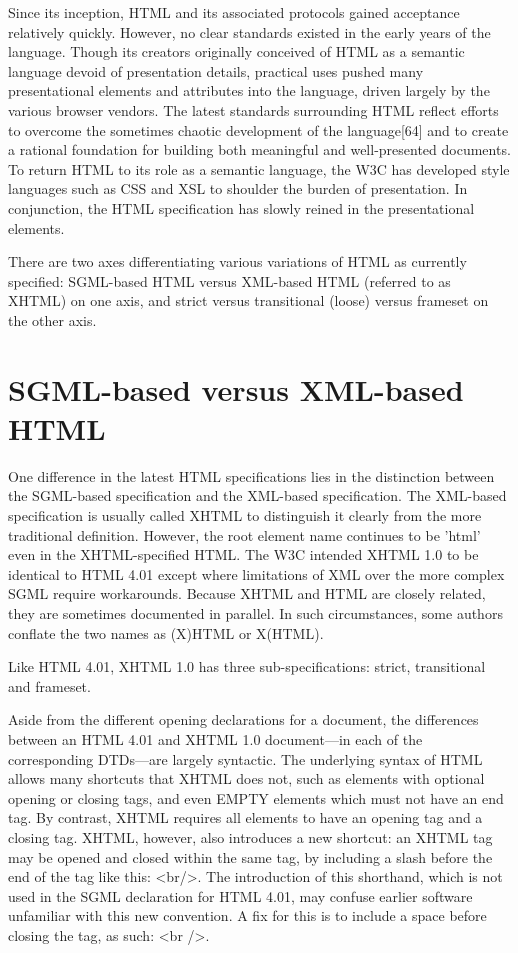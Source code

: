Since its inception, HTML and its associated protocols gained acceptance relatively quickly. However, no clear standards existed in the early years of the language. Though its creators originally conceived of HTML as a semantic language devoid of presentation details, practical uses pushed many presentational elements and attributes into the language, driven largely by the various browser vendors. The latest standards surrounding HTML reflect efforts to overcome the sometimes chaotic development of the language[64] and to create a rational foundation for building both meaningful and well-presented documents. To return HTML to its role as a semantic language, the W3C has developed style languages such as CSS and XSL to shoulder the burden of presentation. In conjunction, the HTML specification has slowly reined in the presentational elements.


There are two axes differentiating various variations of HTML as currently specified: SGML-based HTML versus XML-based HTML (referred to as XHTML) on one axis, and strict versus transitional (loose) versus frameset on the other axis.


\section{SGML-based versus XML-based HTML}


One difference in the latest HTML specifications lies in the distinction between the SGML-based specification and the XML-based specification. The XML-based specification is usually called XHTML to distinguish it clearly from the more traditional definition. However, the root element name continues to be 'html' even in the XHTML-specified HTML. The W3C intended XHTML 1.0 to be identical to HTML 4.01 except where limitations of XML over the more complex SGML require workarounds. Because XHTML and HTML are closely related, they are sometimes documented in parallel. In such circumstances, some authors conflate the two names as (X)HTML or X(HTML).

Like HTML 4.01, XHTML 1.0 has three sub-specifications: strict, transitional and frameset.

Aside from the different opening declarations for a document, the differences between an HTML 4.01 and XHTML 1.0 document—in each of the corresponding DTDs—are largely syntactic. The underlying syntax of HTML allows many shortcuts that XHTML does not, such as elements with optional opening or closing tags, and even EMPTY elements which must not have an end tag. By contrast, XHTML requires all elements to have an opening tag and a closing tag. XHTML, however, also introduces a new shortcut: an XHTML tag may be opened and closed within the same tag, by including a slash before the end of the tag like this: <br/>. The introduction of this shorthand, which is not used in the SGML declaration for HTML 4.01, may confuse earlier software unfamiliar with this new convention. A fix for this is to include a space before closing the tag, as such: <br />.

